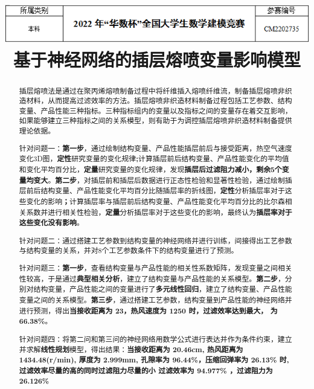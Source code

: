 \documentclass[withoutpreface,bwprint]{cumcmthesis} %
\title{\includegraphics[scale=1]{figures/1.png} 基于神经网络的插层熔喷变量影响模型  }
\begin{document}
 \maketitle
 
 
 \begin{abstract}
插层熔喷法是通过在聚丙烯熔喷制备过程中将纤维插入熔喷纤维流，制备插层熔喷非织造材料，从而提高过滤效率的方法。插层熔喷非织造材料制备过程包括工艺参数、结构变量、产品性能三种指标。三种指标组内的变量以及指标之间的变量存在着交互影响，如果能够建立三种指标之间的关系模型，则有助于为调控插层熔喷非织造材料制备提供理论依据。


针对问题一：\textbf{第一步}，通过绘制结构变量、产品性能插层前后与接受距离，热空气速度变化3D图，\textbf{定性}研究变量的变化规律\textbf{;}计算插层前后结构变量、产品性能变化的平均值和变化平均百分比，\textbf{定量}研究变量的变化规律，发现\textbf{插层后过滤阻力减小，剩余5个变量均变大}。\textbf{第二步}，对插层前和插层后数据进行正态性检验和显著性检验，通过绘制插层前后结构变量、产品性能变化平均百分比随插层率的折线图，\textbf{定性}分析插层率对于这些变化的影响\textbf{；}计算插层率与插层前后结构变量、产品性能变化平均百分比的比尔森相关系数并进行相关性检验，\textbf{定量}分析插层率对于这些变化的影响，最终认为\textbf{插层率对于这些变化没有影响}。




针对问题二：通过搭建工艺参数到结构变量的神经网络并进行训练，间接得出工艺参数与结构变量的关系，并对8个工艺参数条件下的结构变量进行了预测。


针对问题三：\textbf{第一步}，查看结构变量与产品性能的相关性系数矩阵，发现变量之间相关性较高，于是通过\textbf{典型相关分析}，建立了结构变量与产品性能的关系模型。\textbf{第二步}，分别对结构变量，产品性能之间的变量进行了\textbf{多元线性回归}，建立了结构变量、产品性能变量之间的关系模型。\textbf{第三步}，通过搭建工艺参数，结构变量到产品性能的神经网络并进行预测，得出\textbf{当接收距离为 23，热风速度为 1250 时，过滤效率达到最大，
为 66.38\%}。


针对问题四：将第二问和第三问的神经网络用数学公式进行表达并作为条件约束，建立并求解\textbf{线性规划}模型，得出结果：\textbf{当接收距离为 20.46cm, 热风距离为 1434.48(r/min), 厚度为 2.999mm, 孔隙率为 96.44\%，压缩回弹率为 26.13\% 时,过滤效率尽量的高的同时过滤阻力尽量的小 过滤效率为 94.977\% ，过滤阻力为 26.126\%}

\end{abstract}

\end{document}
